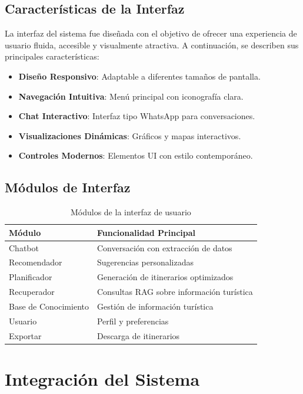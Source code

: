 \documentclass[runningheads]{llncs}
\begin{document}
\subsection{Características de la Interfaz}

La interfaz del sistema fue diseñada con el objetivo de ofrecer una experiencia de usuario fluida, accesible y visualmente atractiva. A continuación, se describen sus principales características:

\begin{itemize}
\item \textbf{Diseño Responsivo}: Adaptable a diferentes tamaños de pantalla.
\item \textbf{Navegación Intuitiva}: Menú principal con iconografía clara.
\item \textbf{Chat Interactivo}: Interfaz tipo WhatsApp para conversaciones.
\item \textbf{Visualizaciones Dinámicas}: Gráficos y mapas interactivos.
\item \textbf{Controles Modernos}: Elementos UI con estilo contemporáneo.
\end{itemize}

\subsection{Módulos de Interfaz}

\begin{table}[H]
\centering
\begin{tabular}{ll}
\toprule
\textbf{Módulo} & \textbf{Funcionalidad Principal} \\
\midrule
Chatbot & Conversación con extracción de datos \\
Recomendador & Sugerencias personalizadas \\
Planificador & Generación de itinerarios optimizados \\
Recuperador & Consultas RAG sobre información turística \\
Base de Conocimiento & Gestión de información turística \\
Usuario & Perfil y preferencias \\
Exportar & Descarga de itinerarios \\
\bottomrule
\end{tabular}
\caption{Módulos de la interfaz de usuario}
\end{table}

\section{Integración del Sistema}
\end{document}

